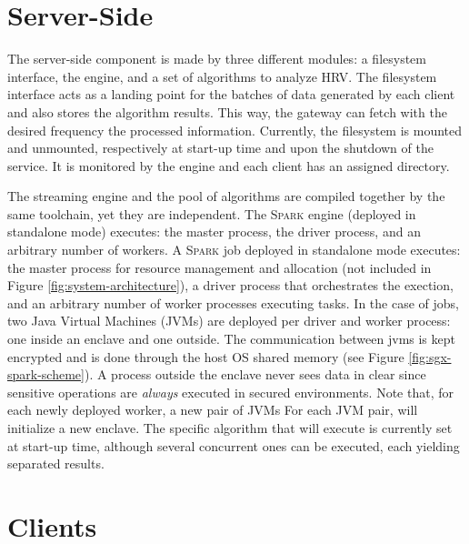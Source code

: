 \section{Server-Side} \label{sec:server}

The server-side component is made by three different modules: a filesystem interface, the \sgxspark engine, and a set of algorithms to analyze HRV. 
The filesystem interface acts as a landing point for the batches of data generated by each client and also stores the algorithm results.
This way, the gateway can fetch with the desired frequency the processed information.
Currently, the filesystem is mounted and unmounted, respectively at start-up time and upon the shutdown of the service. 
It is monitored by the \sgxspark engine and each client has an assigned directory.

The streaming engine and the pool of algorithms are compiled together by the same toolchain, yet they are independent. 
The \textsc{Spark} engine (deployed in standalone mode) executes: the master process, the driver process, and an arbitrary number of workers. 
A \textsc{Spark} job deployed in standalone mode executes: the master process for resource management and allocation (not included in Figure \ref{fig:system-architecture}), a driver process that orchestrates the exection, and an arbitrary number of worker processes executing tasks.
In the case of \sgxspark jobs, two Java Virtual Machines (JVMs) are deployed per driver and worker process: one inside an enclave and one outside.
The communication between \acrshort{jvm}s is kept encrypted and is done through the host OS shared memory (see Figure \ref{fig:sgx-spark-scheme}).
A process outside the enclave never sees data in clear since sensitive operations are \emph{always} executed in secured environments.
Note that, for each newly deployed worker, a new pair of JVMs
For each JVM pair, \sgxspark will initialize a new enclave.
The specific algorithm that \projName will execute is currently set at start-up time, although several concurrent ones can be executed, each yielding separated results. 

\section{Clients} \label{sec:clients}

